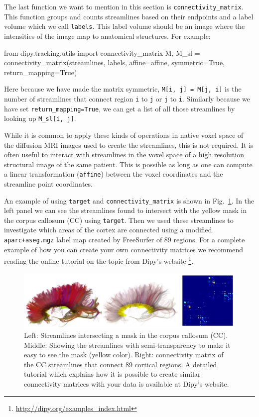 \documentclass{bioinfo}
\begin{document}
The last function we want to mention in this section is
\texttt{connectivity\_matrix}. This function groups and counts streamlines
based on their endpoints and a label volume which we call \texttt{labels}. This
label volume should be an image where the intensities of the image map to
anatomical structures. For example:

\begin{python}
from dipy.tracking.utils import
                              connectivity_matrix
M, M_sl = connectivity_matrix(streamlines, labels,
                              affine=affine,
                              symmetric=True,
                              return_mapping=True)
\end{python}

Here because we have made the matrix symmetric, \texttt{M[i, j] = M[j, i]} is the number of streamlines that connect region \texttt{i} to \texttt{j}
or \texttt{j} to \texttt{i}. Similarly because we have set
\texttt{return\_mapping=True}, we can get a list of all those streamlines by
looking up \texttt{M\_sl[i, j]}.

While it is common to apply these kinds of operations in native voxel space of
the diffusion MRI images used to create the streamlines, this is not
required. It is often useful to interact with streamlines in the voxel space of
a high resolution structural image of the same patient. This is possible as
long as one can compute a linear transformation (\texttt{affine}) between the voxel coordinates and the streamline point coordinates.

An example of using \texttt{target} and \texttt{connectivity\_matrix} is shown in Fig.~\ref{Fig:connectivity}. In the left panel we can see the streamlines found to intersect with the yellow mask in the corpus callosum (CC) using \texttt{target}. Then we used these streamlines to investigate which areas of
the cortex are connected using a modified  \texttt{aparc+aseg.mgz} label map created by FreeSurfer \citep{fischl-freesurfer:12} of 89 regions. For a complete example of how you can create your own connectivity matrices we recommend reading the online tutorial on the topic from Dipy's website \footnote{\url{http://dipy.org/examples\_index.html}}.

\begin{figure}[!htb]
\includegraphics[scale=0.9]{Figures/connectivity_cc.jpg}
\centering{}
\caption{Left: Streamlines intersecting a mask in the corpus callosum (CC).
  Middle: Showing the streamlines with semi-transparency to make it easy to see the mask (yellow color). Right: connectivity matrix of the CC streamlines that connect 89 cortical regions. A detailed tutorial which explains how it is possible to create similar connectivity matrices with your data is available at Dipy's website. \label{Fig:connectivity}}
\end{figure}
\end{document}
